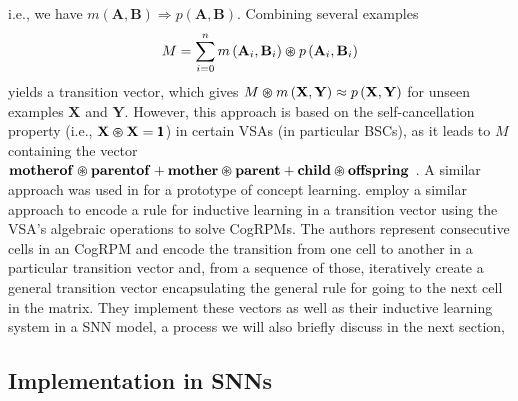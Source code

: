 i.e., we have $m\left(\mathbf{A}, \mathbf{B}\right) \Longrightarrow p\left(\mathbf{A}, \mathbf{B}\right)$.
Combining several examples
\begin{equation*}
	M = \sum_{i=0}^{n} m\left(\mathbf{A}_i, \mathbf{B}_i \right) \varoast p\left(\mathbf{A}_i, \mathbf{B}_i \right)
\end{equation*}
yields a transition vector, which gives $ M \varoast m \left(\mathbf{X}, \mathbf{Y} \right) \approx p \left(\mathbf{X}, \mathbf{Y} \right)$ for unseen examples $\mathbf{X}$ and $\mathbf{Y}$.
However, this approach is based on the self-cancellation property (i.e., $\mathbf{X} \varoast \mathbf{X} = \pmb{1}$) in certain \acp{VSA} (in particular  \acp{BSC}), as it leads to $M$ containing the vector $\mathbf{motherof} \varoast \mathbf{parentof} + \mathbf{mother} \varoast \mathbf{parent} + \mathbf{child} \varoast \mathbf{offspring}$ \parencite[see][for details]{Kanerva2000}.
A similar approach was used in \textcite{Kleyko2015a} for a prototype of concept learning.
\textcite{Rasmussen2011} employ a similar approach to encode a rule for inductive learning in a transition vector using the \ac{VSA}'s algebraic operations to solve \acp{CogRPM}.
The authors represent consecutive cells in an \ac{CogRPM} and encode the transition from one cell to another in a particular transition vector and, from a sequence of those, iteratively create a general transition vector encapsulating the general rule for going to the next cell in the matrix.
They implement these vectors as well as their inductive learning system in a \ac{SNN} model, a process we will also briefly discuss in the next section,

\subsection{Implementation in \aclp{SNN}}%
\label{subsec:implementation_in_snns}

